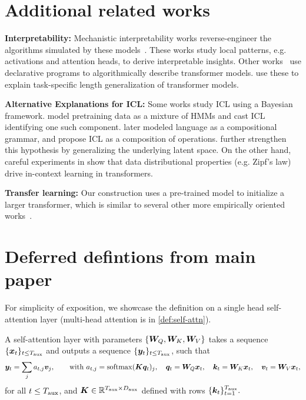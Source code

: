 

\section{Additional related works} \label{sec:additional_related_works}
\textbf{Interpretability:} Mechanistic interpretability works reverse-engineer the algorithms simulated by these models~\citep{elhage2021mathematical, olsson2022context, wang2022interpretability, nanda2023progress, chughtai2023toy, conmy2023towards}. These works study local patterns, e.g. activations and attention heads, to derive interpretable insights. 
Other works~\citep{weiss2021thinking,lindner2023tracr} use declarative programs to algorithmically describe transformer models. \citet{zhou2023algorithms} use these to explain task-specific length generalization of transformer models.


\textbf{Alternative Explanations for ICL:} Some works study ICL using a Bayesian framework. \citet{xie2022an} model pretraining data as a mixture of HMMs and cast ICL identifying one such component. \citet{hahn2023theory} later modeled language as a compositional grammar, and propose ICL as a composition of operations. \cite{zhang2023and,jiang2023latent,wang2023large,wies2023learnability} further strengthen this hypothesis by generalizing the underlying latent space. 
On the other hand, careful experiments in \citet{chan2022data} show that data distributional properties (e.g. Zipf's law) drive in-context learning in transformers.  





\textbf{Transfer learning:} Our construction uses a pre-trained model to initialize a larger transformer, which is similar to several other more empirically oriented works~\citep{gong2019efficient,reddi2023efficient}. 


\section{Deferred defintions from main paper}\label{sec:deferred}

For simplicity of exposition, we showcase the definition on a single head self-attention layer (multi-head attention is in \cref{def:self-attn}).
\begin{definition}
\label{def:self-attn_auxiliary_single}
    A self-attention layer with parameters $\{{\bm{W}}_Q, {\bm{W}}_K, {\bm{W}}_V\}$ takes a sequence $\{ {\bm{x}}_t \}_{t \le T_{\text{aux}}}$ and outputs a sequence $\{ {\bm{y}}_t \}_{t \le T_{\text{aux}}}$, such that
    $$
    {\bm{y}}_t = \sum_{j} a_{t, j} {\bm{v}}_j, \qquad \text{with } a_{t, j} =\mathrm{softmax}({\bm{K}} {\bm{q}}_t)_j, \quad 
    {\bm{q}}_t = {\bm{W}}_Q {\bm{x}}_t, \quad {\bm{k}}_t = {\bm{W}}_K {\bm{x}}_t, \quad {\bm{v}}_t = {\bm{W}}_V {\bm{x}}_t,
    $$
    for all $t \le T_{\text{aux}}$, and ${\bm{K}} \in \mathbb{R}^{ T_{\text{aux}} \times  D_{\text{aux}} }$ defined with rows $\{ {\bm{k}}_t \}_{t=1}^{T_{\text{aux}}}.$

\end{definition}




